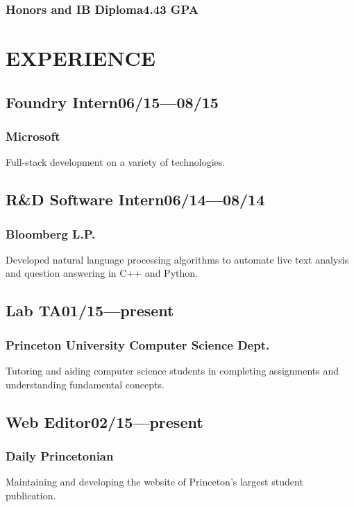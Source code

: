 \documentclass[11pt]{article}
\begin{document}
\begin{multicols}{2}
  \subsubsection*{Honors and IB Diploma\hfill\textnormal{4.43 GPA}}
  \vspace{1.5\baselineskip}

  \section*{EXPERIENCE}
  \subsection*{Foundry Intern\hfill\textnormal{06/15---08/15}}
  \subsubsection*{Microsoft}
  Full-stack development on a variety of technologies.

  \subsection*{R\&D Software Intern\hfill\textnormal{06/14---08/14}}
  \subsubsection*{Bloomberg L.P.}
  Developed natural language processing algorithms to automate live text analysis and question answering in C++ and Python.

  \subsection*{Lab TA\hfill\textnormal{01/15---present}}
  \subsubsection*{Princeton University Computer Science Dept.}
  Tutoring and aiding computer science students in completing assignments and understanding fundamental concepts.

  \subsection*{Web Editor\hfill\textnormal{02/15---present}}
  \subsubsection*{Daily Princetonian}
  Maintaining and developing the website of Princeton's largest student publication.


\end{multicols}
\end{document}
